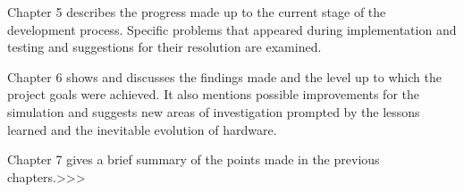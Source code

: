 \documentclass[main.tex]{subfiles}
\begin{document}
Chapter 5 describes the progress made up to the current stage of the development process. Specific problems that appeared during implementation and testing and suggestions for their resolution are examined.

Chapter 6 shows and discusses the findings made and the level up to which the project goals were achieved. It also mentions possible improvements for the simulation and suggests new areas of investigation prompted by the lessons learned and the inevitable evolution of hardware.

Chapter 7 gives a brief summary of the points made in the previous chapters.>>>

\end{document}

